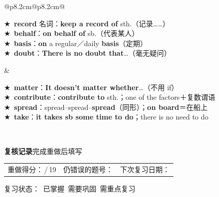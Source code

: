 \documentclass[10pt,a4paper]{article}
\newcommand{\checkmarkbox}{\fbox{\rule{0pt}{0.75ex}\rule{0.75ex}{0pt}}}
\newcommand{\STAR}{\textcolor{wrongred}{\starfont ★}}
\begin{document}
\noindent\begin{tabular}{@{}p{8.2cm}@{\hspace{0.4cm}}p{8.2cm}@{}}
\begin{minipage}[t]{\linewidth}
\footnotesize
\STAR\ \textbf{record} 名词：\textbf{keep a record of} sth.（记录……）\\[0.2em]
\STAR\ \textbf{behalf}：\textbf{on behalf of} sb.（代表某人）\\[0.2em]
\STAR\ \textbf{basis}：\textbf{on} a regular／daily \textbf{basis}（定期）\\[0.2em]
\STAR\ \textbf{doubt}：\textbf{There is no doubt that}…（毫无疑问）
\end{minipage} &
\begin{minipage}[t]{\linewidth}
\footnotesize
\STAR\ \textbf{matter}：\textbf{It doesn't matter whether}…（不用 if）\\[0.2em]
\STAR\ \textbf{contribute}：\textbf{contribute to} sth.；one of the factors＋复数谓语\\[0.2em]
\STAR\ \textbf{spread}：spread--spread--\textbf{spread}（同形）；\textbf{on board}＝在船上\\[0.2em]
\STAR\ \textbf{take}：\textbf{it takes sb some time to do}；there is no need to do
\end{minipage} \\
\end{tabular}

\vspace{0.5em}
\noindent\textbf{复核记录}\hfill\small 完成重做后填写

\vspace{0.3em}
\noindent\begin{tabular}{@{}p{}@{}p{}@{}p{}@{}}
重做得分：\underline{\hspace{1.2cm}}\,/\,19
& 仍错误的题号：\underline{\hspace{3.2cm}}
& 下次复习日期：\underline{\hspace{2.0cm}} \\
\end{tabular}

\vspace{0.3em}
\noindent 复习状态：\checkmarkbox\ 已掌握\quad\checkmarkbox\ 需要巩固\quad\checkmarkbox\ 需重点复习
\end{document}
